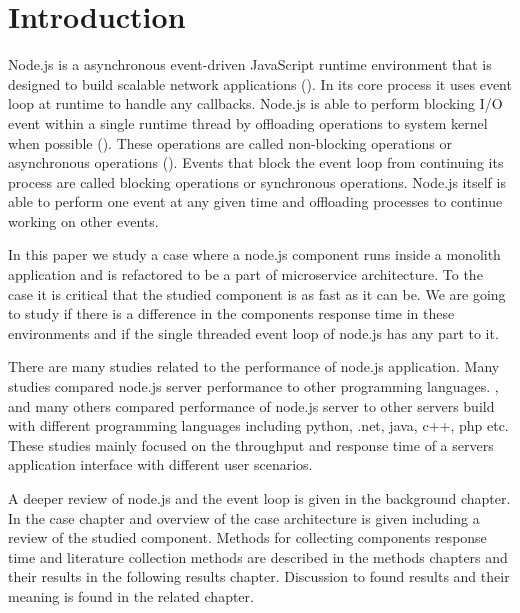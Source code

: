 \chapter{Introduction\label{intro}}
Node.js is a asynchronous event-driven JavaScript runtime environment that is designed to build scalable network applications (\cite{node.jsAbout}).
In its core process it uses event loop at runtime to handle any callbacks.
Node.js is able to perform blocking I/O event within a single runtime thread by offloading operations to system kernel when possible (\cite{node.jsEventLoop}).
These operations are called non-blocking operations or asynchronous operations (\cite{node.jsOverviewBlockVsNonBlock}).
Events that block the event loop from continuing its process are called blocking operations or synchronous operations.
Node.js itself is able to perform one event at any given time and offloading processes to continue working on other events.

In this paper we study a case where a node.js component runs inside a monolith application and is refactored to be a part of microservice architecture.
To the case it is critical that the studied component is as fast as it can be.
We are going to study if there is a difference in the components response time in these environments and if the single threaded event loop of node.js has any part to it.

There are many studies related to the performance of node.js application.
Many studies compared node.js server performance to other programming languages.
\cite{Challapalli}, \cite{Lion} and many others compared performance of node.js server to other servers build with different programming languages including python, .net, java, c++, php etc.
These studies mainly focused on the throughput and response time of a servers application interface with different user scenarios.

A deeper review of node.js and the event loop is given in the background chapter.
In the case chapter and overview of the case architecture is given including a review of the studied component.
Methods for collecting components response time and literature collection methods are described in the methods chapters and their results in the following results chapter.
Discussion to found results and their meaning is found in the related chapter.

